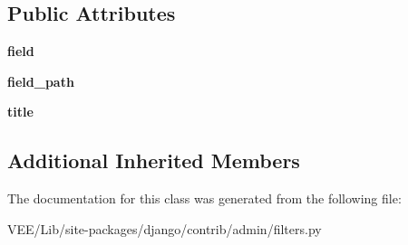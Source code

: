 \subsection*{Public Attributes}
\begin{DoxyCompactItemize}
\item 
\mbox{\label{classdjango_1_1contrib_1_1admin_1_1filters_1_1_field_list_filter_adb3da898fcea25f15e9841a40c3b6572}} 
{\bfseries field}
\item 
\mbox{\label{classdjango_1_1contrib_1_1admin_1_1filters_1_1_field_list_filter_a472b2d0cde865c1471475c160d7bf129}} 
{\bfseries field\+\_\+path}
\item 
\mbox{\label{classdjango_1_1contrib_1_1admin_1_1filters_1_1_field_list_filter_aa5a0227807b38769c569a662bbd06af9}} 
{\bfseries title}
\end{DoxyCompactItemize}
\subsection*{Additional Inherited Members}


The documentation for this class was generated from the following file\+:\begin{DoxyCompactItemize}
\item 
V\+E\+E/\+Lib/site-\/packages/django/contrib/admin/filters.\+py\end{DoxyCompactItemize}
